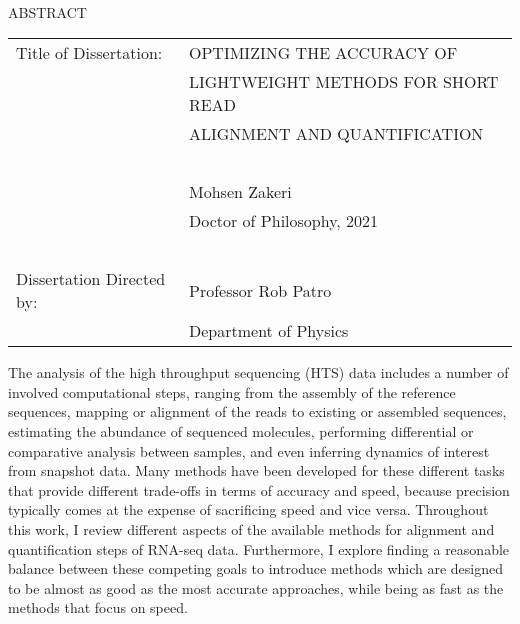 
\hbox{\ }

\renewcommand{\baselinestretch}{1}
\small \normalsize

\begin{center}
\large{{ABSTRACT}}

\vspace{3em}

\end{center}
\hspace{-.15in}
\begin{tabular}{ll}
Title of Dissertation:    & {\large  OPTIMIZING THE ACCURACY OF }\\
&                     {\large  LIGHTWEIGHT METHODS FOR SHORT READ} \\
&                     {\large  ALIGNMENT AND QUANTIFICATION} \\
\ \\
&                          {\large  Mohsen Zakeri} \\
&                           {\large Doctor of Philosophy, 2021} \\
\ \\
Dissertation Directed by: & {\large  Professor Rob Patro} \\
&               {\large  Department of Physics } \\
\end{tabular}

\vspace{3em}

\renewcommand{\baselinestretch}{2}
\large \normalsize

The analysis of the high throughput sequencing (HTS) data includes 
a number of involved computational steps, ranging from the assembly 
of the reference sequences, mapping or alignment of the reads to 
existing or assembled sequences, estimating the abundance of 
sequenced molecules, performing differential or comparative 
analysis between samples, and even inferring dynamics of interest 
from snapshot data. Many methods have been developed for these 
different tasks that provide different trade-offs in terms of 
accuracy and speed, because precision typically comes at the 
expense of sacrificing speed and vice versa. Throughout this 
work, I review different aspects of the available methods for 
alignment and quantification steps of RNA-seq data. Furthermore, 
I explore finding a reasonable balance between these competing 
goals to introduce methods which are designed to be almost as 
good as the most accurate approaches, while being as fast as the 
methods that focus on speed.

